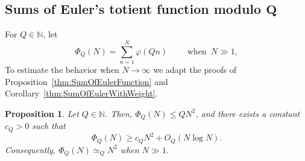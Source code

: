 \documentclass[11pt,reqno]{amsart}
\newtheorem{prop}[thm]{Proposition}
\theoremstyle{definition}
\begin{document}
\subsection{Sums of Euler's totient function modulo $\boldsymbol{Q}$}\label{sec:SumsEulerModQ}
For $Q \in \mathbb N$, let
\begin{equation}
\Phi_Q(N) = \sum_{n=1}^N \varphi(Qn) \qquad \text{ when } \, N \gg 1,
\end{equation}
To estimate the behavior when $N \to \infty$
we adapt the proofs of Proposition~\ref{thm:SumOfEulerFunction}
and Corollary~\ref{thm:SumOfEulerWithWeight}. 
\begin{prop}\label{thm:SumOfEulerFunctionQ}
Let $Q \in \mathbb N$. 
Then, $\Phi_Q(N) \leq QN^2$, and there exists a constant $c_Q > 0$ such that 
\begin{equation}
\Phi_Q(N) \geq c_Q N^2 + O_Q( N \log N).  
\end{equation}
Consequently,
 $\Phi_Q(N) \simeq _Q N^2$ when $N \gg 1$.  
\end{prop}
\end{document}
